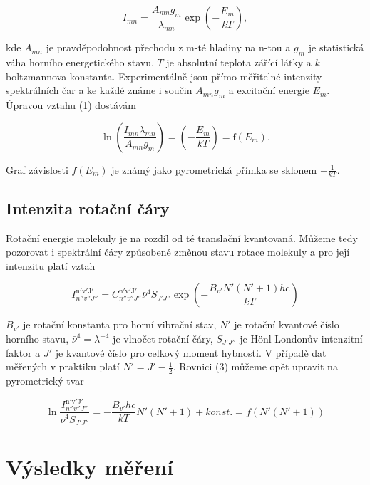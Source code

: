 \documentclass[a4paper,11pt]{article}
\begin{document}
\begin{equation}
    I_{mn} =  \frac{A_{mn}g_m}{\lambda_{mn}} \exp \left( -\frac{E_m}{kT} \right),
\end{equation}

\noindent
kde $ A_{mn} $  je pravděpodobnost přechodu z m-té hladiny na n-tou a $ g_m $  je statistická váha horního energetického stavu. $ T $ je absolutní teplota zářící látky a $ k $ boltzmannova konstanta.  Experimentálně jsou přímo měřitelné intenzity spektrálních čar a ke každé známe i součin $ A_{mn} g_m $ a excitační energie $ E_m $. Úpravou vztahu (1) dostávám

\begin{equation}
\ln \left( \frac{I_{mn}\lambda_{mn}}{A_{mn}g_m} \right) = \left( - \frac{E_m}{kT} \right) = \mathrm{f} (E_m).
\end{equation}

Graf závislosti $ f(E_m) $ je známý jako pyrometrická přímka se sklonem $ - \frac{1}{kT} $.

\subsection{Intenzita rotační čáry}

Rotační energie molekuly je na rozdíl od té translační kvantovaná. Můžeme tedy pozorovat i spektrální čáry způsobené změnou stavu rotace molekuly a pro její intenzitu platí vztah

\begin{equation}
I_{n''v''J''}^\mathrm{n'v'J'} = C_{n''v''J''}^\mathrm{n'v'J'} \bar{\nu}^{4} S_{J'J''}\exp \left(-\frac{B_{v'} N' (N' + 1) hc}{kT} \right)
\end{equation}

\noindent
$ B_{v'} $  je rotační konstanta pro horní vibrační stav, $ N' $  je rotační kvantové číslo horního stavu, $ \bar{\nu}^{4} = \lambda^{-4} $ je vlnočet rotační čáry, $ S_{J'J''} $ je Hönl-Londonův intenzitní faktor a $ J' $ je kvantové číslo pro celkový moment hybnosti. V případě dat měřených v praktiku platí $ N' = J' - \frac{1}{2} $. Rovnici (3) můžeme opět upravit na pyrometrický tvar

\begin{equation}
\ln \frac{I_{n''v''J''}^\mathrm{n'v'J'}}{\bar{\nu}^{4} S_{J'J''}} = -\frac{B_{v'} hc}{kT} N' (N' + 1)  + konst. = f(N' (N' + 1))
\end{equation}


\newpage

\section{Výsledky měření}
\end{document}
